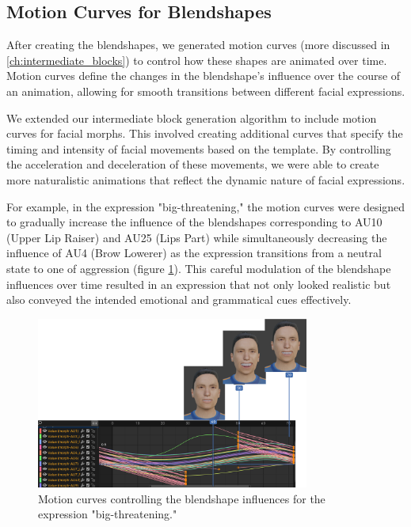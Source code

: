 \documentclass[../../main.tex]{subfiles}
\begin{document}
\subsection{Motion Curves for Blendshapes}
\label{ch:facial_expressions:motion_curves_for_blendshapes}

After creating the blendshapes, we generated motion curves (more discussed in \ref{ch:intermediate_blocks}) to control how these shapes are animated over time. Motion curves define the changes in the blendshape's influence over the course of an animation, allowing for smooth transitions between different facial expressions.

We extended our intermediate block generation algorithm to include motion curves for facial morphs. This involved creating additional curves that specify the timing and intensity of facial movements based on the template. By controlling the acceleration and deceleration of these movements, we were able to create more naturalistic animations that reflect the dynamic nature of facial expressions.

For example, in the expression "big-threatening," the motion curves were designed to gradually increase the influence of the blendshapes corresponding to AU10 (Upper Lip Raiser) and AU25 (Lips Part) while simultaneously decreasing the influence of AU4 (Brow Lowerer) as the expression transitions from a neutral state to one of aggression (figure \ref{fig:motion_curve_example}). This careful modulation of the blendshape influences over time resulted in an expression that not only looked realistic but also conveyed the intended emotional and grammatical cues effectively.

\begin{figure}
    \centering
    \includegraphics[width=0.8\textwidth]{chapters/facial_expressions/images/motion_curve_example.png}
    \caption{Motion curves controlling the blendshape influences for the expression "big-threatening."}
    \label{fig:motion_curve_example}
\end{figure}
\end{document}
